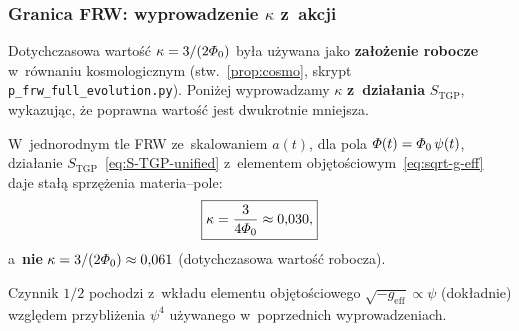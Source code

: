 \subsubsection{Granica FRW: wyprowadzenie $\kappa$ z~akcji}%
\label{sssec:kappa-derivation}\label{ssec:kappa-obs}

Dotychczasowa warto\'s\'c $\kappa = 3/(2\varPhi_0)$ by\l{}a
u\.zywana jako \textbf{za\l{}o\.zenie robocze} w~r\'ownaniu
kosmologicznym (stw.~\ref{prop:cosmo},
skrypt \texttt{p\_frw\_full\_evolution.py}).
Poni\.zej wyprowadzamy $\kappa$ \textbf{z~dzia\l{}ania}
$S_{\mathrm{TGP}}$, wykazuj\k{a}c, \.ze poprawna warto\'s\'c
jest dwukrotnie mniejsza.

\begin{proposition}%
\label{prop:kappa-corrected}

W~jednorodnym tle FRW ze~skalowaniem $a(t)$,
dla pola $\varPhi(t) = \varPhi_0\,\psi(t)$, dzia\l{}anie
$S_{\mathrm{TGP}}$~\eqref{eq:S-TGP-unified} z~elementem
obj\k{e}to\'sciowym~\eqref{eq:sqrt-g-eff} daje sta\l{}\k{a}
sprz\k{e}\.zenia materia--pole:
\begin{equation}\label{eq:kappa-corrected}
  \boxed{
    \kappa = \frac{3}{4\varPhi_0}
    \approx 0{,}030,
  }
\end{equation}
a~\textbf{nie} $\kappa = 3/(2\varPhi_0) \approx 0{,}061$
(dotychczasowa warto\'s\'c robocza).

Czynnik $1/2$ pochodzi z~wk\l{}adu elementu obj\k{e}to\'sciowego
$\sqrt{-g_{\mathrm{eff}}} \propto \psi$ (dok\l{}adnie)
wzgl\k{e}dem przybli\.zenia $\psi^4$
u\.zywanego w~poprzednich wyprowadzeniach.
\end{proposition}

